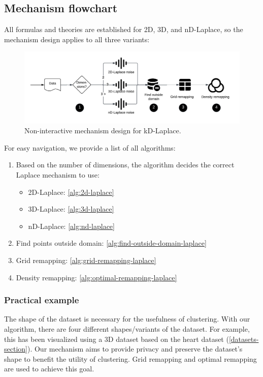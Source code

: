 \subsection{Mechanism flowchart}
All formulas and theories are established for 2D, 3D, and nD-Laplace, so the mechanism design applies to all three variants:
\begin{figure}[h]
  \includegraphics[width=1.1\textwidth]{TheorethicalFramework/ND-Laplace/Images/final-mechanism-design.png}
  \caption{Non-interactive mechanism design for kD-Laplace.}
  \label{fig:final-mechanism-design}
\end{figure}
For easy navigation, we provide a list of all algorithms:
\begin{enumerate}
  \item Based on the number of dimensions, the algorithm decides the correct Laplace mechanism to use:
        \begin{itemize}
          \item 2D-Laplace:  \ref{alg:2d-laplace}
          \item 3D-Laplace: \ref{alg:3d-laplace}
          \item nD-Laplace: \ref{alg:nd-laplace}
        \end{itemize}
  \item Find points outside domain: \ref{alg:find-outside-domain-laplace}
  \item Grid remapping: \ref{alg:grid-remapping-laplace}
  \item Density remapping: \ref{alg:optimal-remapping-laplace}
\end{enumerate}
\subsubsection{Practical example}
The shape of the dataset is necessary for the usefulness of clustering.
With our algorithm, there are four different shapes/variants of the dataset.
For example, this has been visualized using a 3D dataset based on the heart dataset (\ref{datasets-section}).
Our mechanism aims to provide privacy and preserve the dataset's shape to benefit the utility of clustering.
Grid remapping and optimal remapping are used to achieve this goal.

